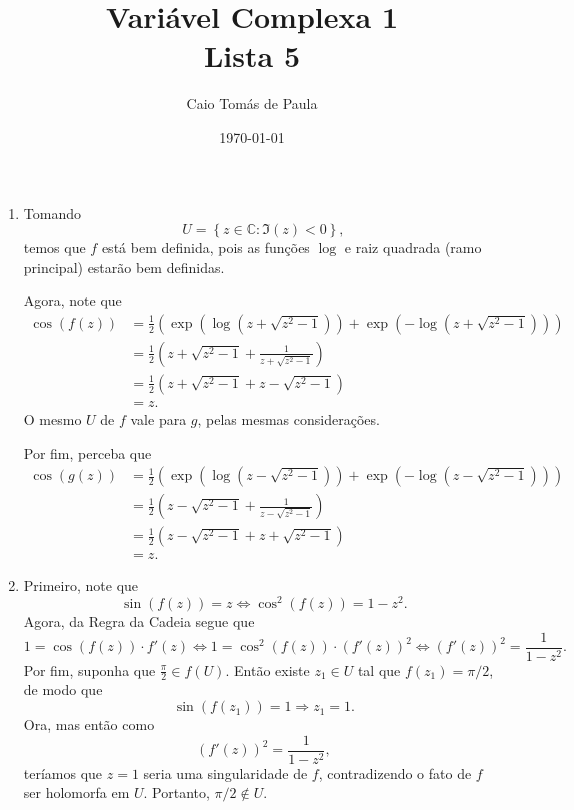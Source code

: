 \documentclass[12pt,a4paper]{article}
\title{\textbf{Variável Complexa 1}\\ Lista 5}
\author{Caio Tomás de Paula}
\date{\today}
\begin{document}
	\maketitle
	\begin{enumerate}
		\item Tomando 
		$$
		U = \left\{ z\in\mathbb{C} : \Im(z)<0 \right\},
		$$
		temos que $f$ está bem definida, pois as funções $\log$ e raiz quadrada (ramo principal) estarão bem definidas. 
		
		Agora, note que
		\begin{align*}
		\cos(f(z)) &= \frac{1}{2}\left( \exp\left( \log\left( z+\sqrt{z^2-1} \right) \right) + \exp\left( -\log\left( z+\sqrt{z^2-1} \right) \right) \right) \\
		&= \frac{1}{2}\left( z+\sqrt{z^2-1} + \frac{1}{z+\sqrt{z^2-1}} \right) \\
		&= \frac{1}{2}\left( z+\sqrt{z^2-1} + z-\sqrt{z^2-1} \right) \\
		&= z.
		\end{align*}
		O mesmo $U$ de $f$ vale para $g$, pelas mesmas considerações.
		
		Por fim, perceba que
		\begin{align*}
		\cos(g(z)) &= \frac{1}{2}\left( \exp\left( \log\left( z-\sqrt{z^2-1} \right) \right) + \exp\left( -\log\left( z-\sqrt{z^2-1} \right) \right) \right) \\
		&= \frac{1}{2}\left( z-\sqrt{z^2-1} + \frac{1}{z-\sqrt{z^2-1}} \right) \\
		&= \frac{1}{2}\left( z-\sqrt{z^2-1} + z+\sqrt{z^2-1} \right) \\
		&= z.
		\end{align*}
		
		\item Primeiro, note que 
		$$
		\sin(f(z)) = z \Longleftrightarrow \cos^2(f(z)) = 1 - z^2.
		$$
		Agora, da Regra da Cadeia segue que
		$$
		1 = \cos(f(z))\cdot f'(z) \Longleftrightarrow 1 = \cos^2(f(z))\cdot(f'(z))^2 \Longleftrightarrow (f'(z))^2 = \frac{1}{1-z^2}.
		$$
		Por fim, suponha que $\displaystyle{\frac{\pi}{2}\in f(U)}$. Então existe $z_1\in U$ tal que $f(z_1) = \pi/2$, de modo que
		$$
		\sin(f(z_1)) = 1 \Longrightarrow z_1 = 1.
		$$
		Ora, mas então como
		$$
		(f'(z))^2 = \frac{1}{1-z^2},
		$$
		teríamos que $z=1$ seria uma singularidade de $f$, contradizendo o fato de $f$ ser holomorfa em $U$. Portanto, $\pi/2\notin U$. 
		

\end{enumerate}
\end{document}
